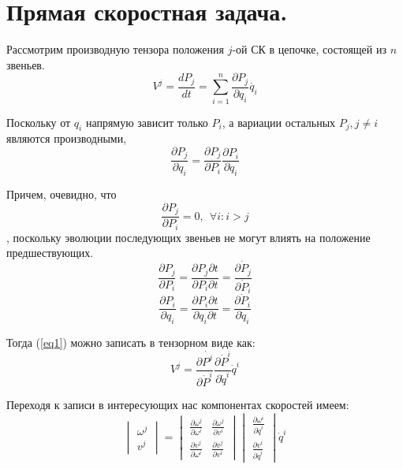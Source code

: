 \section{Прямая скоростная задача.}\label{straight}

Рассмотрим производную тензора положения $j$-ой СК в цепочке, состоящей из $n$ звеньев.
\begin{equation}\label{eq1}
V^j = \frac{dP_j}{dt} = \sum_{i=1}^{n}\frac{\partial{P_j}}{\partial{q_i}}\dot{q_i} 
\end{equation}

Поскольку от $q_i$ напрямую зависит только $P_i$, а вариации остальных $P_j, j \neq i$ являются производными,
\begin{equation}\label{}
\frac{\partial{P_j}}{\partial{q_i}} = \frac{\partial{P_j}}{\partial{P_i}}\frac{\partial{P_i}}{\partial{q_i}}
\end{equation}

Причем, очевидно, что 
\begin{equation}\label{}
\frac{\partial{P_j}}{\partial{P_i}} = 0, \ \ \forall i: i > j
\end{equation}
, поскольку эволюции последующих звеньев не могут влиять на положение предшествующих.
\begin{equation}\label{}
\frac{\partial{P_j}}{\partial{P_i}} = \frac{\partial{P_j}\partial{t}}{\partial{P_i}\partial{t}} = \frac{\partial{\dot{P}_j}}{\partial{\dot{P}_i}}
\end{equation}
\begin{equation}\label{}
\frac{\partial{P_i}}{\partial{q_i}} = \frac{\partial{P_i}\partial{t}}{\partial{q_i}\partial{t}} = \frac{\partial{\dot{P}_i}}{\partial{\dot{q}_i}}
\end{equation}

Тогда (\ref{eq1}) можно записать в тензорном виде как:
\begin{equation}\label{eq2}
V^j = \frac{\partial{\dot{P^j}}}{\partial{\dot{P}^i}}\frac{\partial{\dot{P}^i}}{\partial{\dot{q}^i}}\dot{q}^i 
\end{equation}

Переходя к записи в интересующих нас компонентах скоростей имеем:
\begin{equation}\label{matrix_spd_eq}
\begin{vmatrix}
\omega^j\\
v^j
\end{vmatrix}
=
\begin{vmatrix}
\frac{\partial{\omega^j}}{\partial{\omega^i}} & \frac{\partial{\omega^j}}{\partial{v^i}} \\
\frac{\partial{v^j}}{\partial{\omega^i}} & \frac{\partial{v^j}}{\partial{v^i}}
\end{vmatrix}
\begin{vmatrix}
\frac{\partial{\omega^i}}{\partial{\dot{q}^i}}\\
\frac{\partial{v^i}}{\partial{\dot{q}^i}}
\end{vmatrix}
\dot{q}^i
\end{equation}

